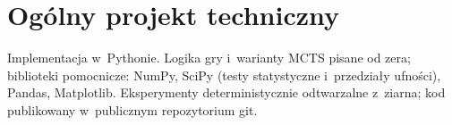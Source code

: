 \documentclass[11pt,a4paper]{article}
\begin{document}
\section{Ogólny projekt techniczny}

Implementacja w~Pythonie. Logika gry i~warianty MCTS pisane od zera; biblioteki pomocnicze: NumPy, SciPy (testy statystyczne i~przedziały ufności), Pandas, Matplotlib. Eksperymenty deterministycznie odtwarzalne z~ziarna; kod publikowany w~publicznym repozytorium git.



\end{document}
